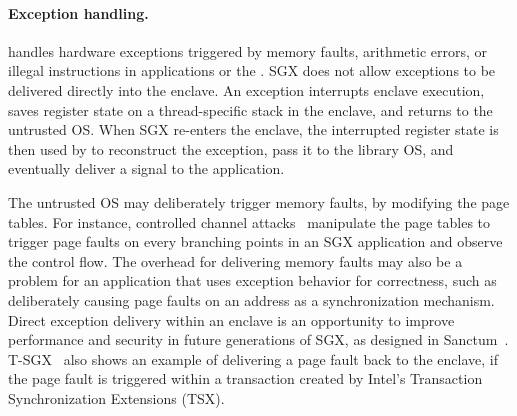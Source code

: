\paragraph{Exception handling.}
\graphenesgx{} handles hardware exceptions triggered by memory faults, arithmetic errors, or illegal instructions in applications or the \libos{}.
SGX does not allow exceptions to be delivered directly into the enclave.
An exception interrupts enclave execution, 
saves register state on a thread-specific stack in the enclave,
and returns to the untrusted OS.
When SGX re-enters the enclave, the interrupted register state
is then used by
\graphenesgx{} to reconstruct the exception, pass it to the library OS, and eventually deliver a signal to the application.



The untrusted OS may deliberately trigger memory faults, %
by modifying the page tables.
For instance, controlled channel attacks~\cite{xu15controlledchannel}
manipulate the page tables to trigger page faults on every branching points in an SGX application
and observe the control flow.
The overhead for delivering memory faults
may also be a problem
for an application that uses exception behavior for correctness, such as deliberately causing page faults on an address as a synchronization mechanism.
Direct exception delivery within an enclave %
is an opportunity to improve performance and security in future generations of SGX,
as designed in Sanctum~\cite{costan2016sanctum}.
T-SGX~\cite{shih2017t-sgx}
also shows an example of delivering a page fault back to the enclave, if the page fault
is triggered within a transaction created by Intel's Transaction Synchronization Extensions (TSX).



